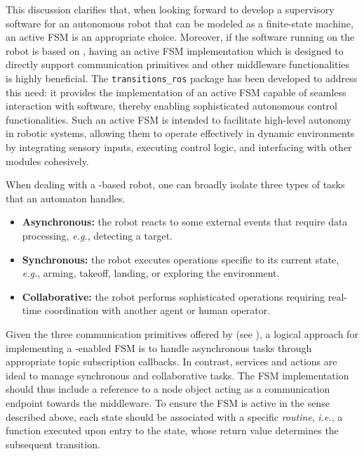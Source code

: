 This discussion clarifies that, when looking forward to develop a supervisory software for an autonomous robot that can be modeled as a finite-state machine, an active FSM is an appropriate choice. Moreover, if the software running on the robot is based on \ROS, having an active FSM implementation which is designed to directly support \ROS communication primitives and other middleware functionalities is highly beneficial. The \texttt{transitions\_ros} package \cite{masocco_transitions_ros_2022} has been developed to address this need: it provides the implementation of an active FSM capable of seamless interaction with \ROS software, thereby enabling sophisticated autonomous control functionalities. Such an active FSM is intended to facilitate high-level autonomy in robotic systems, allowing them to operate effectively in dynamic environments by integrating sensory inputs, executing control logic, and interfacing with other modules cohesively.

When dealing with a \ROS-based robot, one can broadly isolate three types of tasks that an automaton handles.
\begin{itemize}
  \item \textbf{Asynchronous:} the robot reacts to some external events that require data processing, \emph{e.g.}, detecting a target.
  \item \textbf{Synchronous:} the robot executes operations specific to its current state, \emph{e.g.}, arming, takeoff, landing, or exploring the environment.
  \item \textbf{Collaborative:} the robot performs sophisticated operations requiring real-time coordination with another agent or human operator.
\end{itemize}
Given the three communication primitives offered by \ROS (see ), a logical approach for implementing a \ROS-enabled FSM is to handle asynchronous tasks through appropriate topic subscription callbacks. In contrast, services and actions are ideal to manage synchronous and collaborative tasks. The FSM implementation should thus include a reference to a \ROS node object acting as a communication endpoint towards the middleware. To ensure the FSM is active in the sense described above, each state should be associated with a specific \emph{routine}, \emph{i.e.}, a function executed upon entry to the state, whose return value determines the subsequent transition.


